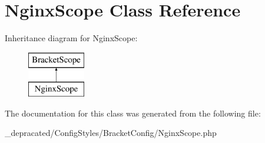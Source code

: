 \hypertarget{class_config_styles_1_1_bracket_config_1_1_nginx_scope}{
\section{\-Nginx\-Scope \-Class \-Reference}
\label{class_config_styles_1_1_bracket_config_1_1_nginx_scope}
}
\-Inheritance diagram for \-Nginx\-Scope\-:\begin{figure}[H]
\begin{center}
\leavevmode
\includegraphics[height=2.000000cm]{class_config_styles_1_1_bracket_config_1_1_nginx_scope}
\end{center}
\end{figure}


\-The documentation for this class was generated from the following file\-:\begin{DoxyCompactItemize}
\item 
\-\_\-depracated/\-Config\-Styles/\-Bracket\-Config/\-Nginx\-Scope.\-php\end{DoxyCompactItemize}
